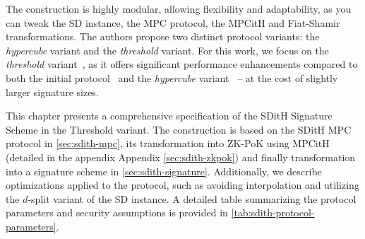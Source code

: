 \documentclass[11pt]{report}
\theoremstyle{definition}
\theoremstyle{plain}
\begin{document}
The construction is highly modular, allowing flexibility and adaptability, as you can tweak the SD instance, the MPC protocol, the MPCitH and Fiat-Shamir transformations. The authors propose two distinct protocol variants: the \textit{hypercube} variant and the \textit{threshold} variant. For this work, we focus on the \textit{threshold} variant~\cite{aguilarsyndrome11,feneuil2023threshold,feneuil2023threshold2}, as it offers significant performance enhancements compared to both the initial protocol~\cite{feneuil2022syndrome} and the \textit{hypercube} variant~\cite{aguilarsyndrome11,aguilar2023return,feneuil2023threshold2} -- at the cost of slightly larger signature sizes.

This chapter presents a comprehensive specification of the SDitH Signature Scheme in the Threshold variant. The construction is based on the SDitH MPC protocol in \autoref{sec:sdith-mpc}, its transformation into ZK-PoK using MPCitH (detailed in the appendix Appendix \ref{sec:sdith-zkpok}) and finally transformation into a signature scheme in \autoref{sec:sdith-signature}. Additionally, we describe optimizations applied to the protocol, such as avoiding interpolation and utilizing the $d$-split variant of the SD instance. A detailed table summarizing the protocol parameters and security assumptions is provided in \autoref{tab:sdith-protocol-parameters}.
\end{document}
